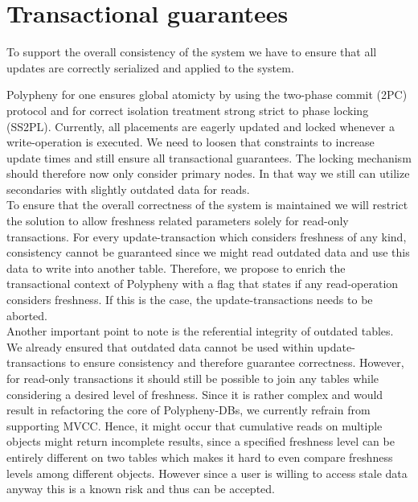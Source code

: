 \section{ Transactional guarantees }
\label{consistency}

To support the overall consistency of the system we have to ensure that all updates are correctly serialized and applied to the system.

Polypheny for one ensures global atomicty by using the two-phase commit (2PC) protocol and for correct isolation treatment
strong strict to phase locking (SS2PL). Currently, all placements are eagerly updated and locked whenever a write-operation is executed.
We need to loosen that constraints to increase update times and still ensure all transactional guarantees. The locking mechanism should therefore 
now only consider primary nodes. In that way we still can utilize secondaries with slightly outdated data for reads.\\

To ensure that the overall correctness of the system is maintained we will restrict the solution to allow freshness related parameters solely
for read-only transactions. For every update-transaction which considers freshness of any kind, consistency cannot be guaranteed since we might read outdated data
and use this data to write into another table. Therefore, we propose to enrich  the transactional context of Polypheny with a flag that states if any read-operation 
considers freshness. If this is the case, the update-transactions needs to be aborted.\\


Another important point to note is the referential integrity of outdated tables. We already ensured that outdated data cannot be used within update-transactions to 
ensure consistency and therefore guarantee correctness. However, for read-only transactions it should still be possible to join any tables while considering 
a desired level of freshness. 
Since it is rather complex and would result in refactoring the core of Polypheny-DBs, we currently refrain from supporting MVCC.
Hence, it might occur that cumulative reads on multiple objects might return incomplete results, since a specified freshness
level can be entirely different on two tables which makes it hard to even compare freshness levels among different objects. However since a user is willing to access 
stale data anyway this is a known risk and thus can be accepted.\\

